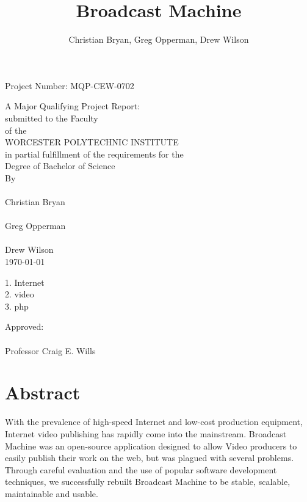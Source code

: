 \documentclass[a4paper,12pt]{report}
\title{Broadcast Machine}
\author{Christian Bryan, Greg Opperman, Drew Wilson}
\begin{document}
\begin{titlepage}
  \topmargin 0.5in
  \headheight 0in
\begin{center}
  \begin{flushright}
Project Number: MQP-CEW-0702\\
\end{flushright}
\vspace*{40mm}
A Major Qualifying Project Report:\\
submitted to the Faculty\\
of the\\
WORCESTER POLYTECHNIC INSTITUTE\\
in partial fulfillment of the requirements for the\\
Degree of Bachelor of Science\\
By\\
\makebox[2in]{\hrulefill}\\
Christian Bryan\\
\vspace*{10mm}
\makebox[2in]{\hrulefill}\\
Greg Opperman\\
\vspace*{10mm}
\makebox[2in]{\hrulefill}\\
Drew Wilson\\
\vspace*{10mm}
\today\\
\vspace*{10mm}
\begin{flushleft}
  1. Internet\\
  2. video\\
  3. php\\
\end{flushleft}
\begin{flushright}
Approved:\\
\vspace*{10mm}
\makebox[2in]{\hrulefill}\\
Professor Craig E. Wills\\
\end{flushright}
\end{center}
\end{titlepage}

\chapter*{Abstract}
With the prevalence of high-speed Internet and low-cost production equipment, Internet video publishing has rapidly come into the 
mainstream.
Broadcast Machine was an open-source application designed to allow Video producers to easily publish their work on the web, but was plagued with several problems.
Through careful evaluation and the use of popular software development techniques, we successfully rebuilt Broadcast Machine to be stable, scalable, maintainable and usable.
\end{document}
